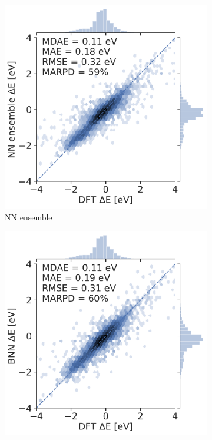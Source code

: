 \documentclass[]{achemso}
\begin{document}
\begin{figure}
    \centering
    \begin{subfigure}{0.32\textwidth}
        \includegraphics[width=\textwidth]{../NN_ensemble/parity.pdf}
        \caption{\gls{NN} ensemble}\label{fig:parity_ensemble}
    \end{subfigure}
    \begin{subfigure}{0.32\textwidth}
        \includegraphics[width=\textwidth]{../BNN/parity.pdf}

\end{subfigure}
\end{figure}
\end{document}
